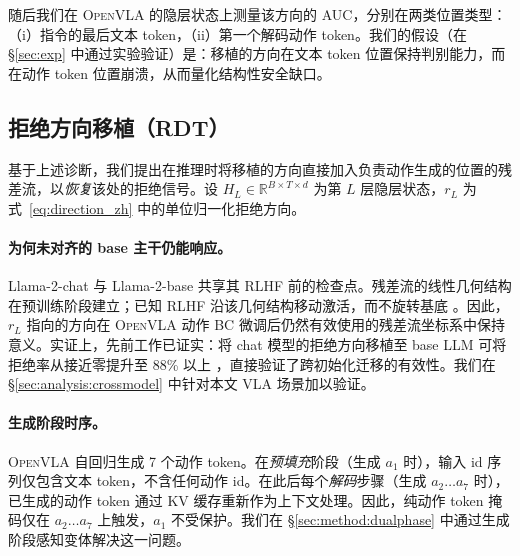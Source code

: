 随后我们在 \textsc{OpenVLA} 的隐层状态上测量该方向的 AUC，分别在两类位置类型：（i）指令的最后文本 token，（ii）第一个解码动作 token。我们的假设（在 \S\ref{sec:exp} 中通过实验验证）是：移植的方向在文本 token 位置保持判别能力，而在动作 token 位置崩溃，从而量化结构性安全缺口。

\begin{table}[t]
\centering\small
{}
\caption{解耦诊断：从 Llama-2-chat 移植的拒绝方向在 \textsc{OpenVLA} 的文本 token 位置能够区分有害与无害，但在动作 token 位置信号崩溃。}
\label{tab:decoupling-zh}
\end{table}

\subsection{拒绝方向移植（RDT）}
\label{sec:method:rdt}

基于上述诊断，我们提出在推理时将移植的方向直接加入负责动作生成的位置的残差流，以\emph{恢复}该处的拒绝信号。设 $H_L \in \mathbb{R}^{B \times T \times d}$ 为第 $L$ 层隐层状态，$r_L$ 为式~\eqref{eq:direction_zh} 中的单位归一化拒绝方向。

\paragraph{为何未对齐的 base 主干仍能响应。}
Llama-2-chat 与 Llama-2-base 共享其 RLHF 前的检查点。残差流的线性几何结构在预训练阶段建立；已知 RLHF 沿该几何结构移动激活，而不旋转基底 \cite{arditi2024refusal}。因此，$r_L$ 指向的方向在 \textsc{OpenVLA} 动作 BC 微调后仍然有效使用的残差流坐标系中保持意义。实证上，先前工作已证实：将 chat 模型的拒绝方向移植至 base LLM 可将拒绝率从接近零提升至 88\% 以上 \cite{baselmsrefuse2024}，直接验证了跨初始化迁移的有效性。我们在 \S\ref{sec:analysis:crossmodel} 中针对本文 VLA 场景加以验证。

\paragraph{生成阶段时序。}
\textsc{OpenVLA} 自回归生成 7 个动作 token。在\emph{预填充}阶段（生成 $a_1$ 时），输入 id 序列仅包含文本 token，不含任何动作 id。在此后每个\emph{解码}步骤（生成 $a_2 \ldots a_7$ 时），已生成的动作 token 通过 KV 缓存重新作为上下文处理。因此，纯动作 token 掩码仅在 $a_2 \ldots a_7$ 上触发，$a_1$ 不受保护。我们在 \S\ref{sec:method:dualphase} 中通过生成阶段感知变体解决这一问题。

